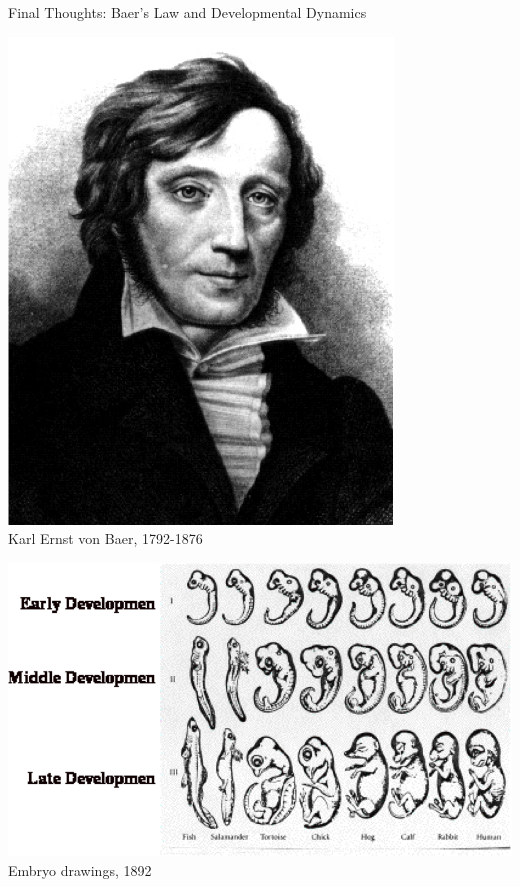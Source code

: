 \documentclass[10pt]{beamer}
\begin{document}
\begin{frame}{Final Thoughts: Baer's Law and Developmental Dynamics}

\begin{minipage}{0.3\textwidth}
\centering
\includegraphics[width=\textwidth]{vonbaer} \\
Karl Ernst von Baer, 1792-1876
\end{minipage}
\hfill
\begin{minipage}{0.65\textwidth}
\centering
\includegraphics[width=\textwidth]{stages_development}\\
Embryo drawings, 1892
\end{minipage}

\end{frame}


\end{document}

